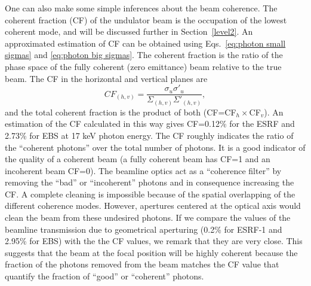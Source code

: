 \documentclass{iucr}              %
\begin{document}
One can also make some simple inferences about the beam coherence. The coherent fraction (CF) \cite{arxivCF} of the undulator beam is the occupation of the lowest coherent mode, and will be discussed further in Section~\ref{level2}. An approximated estimation of CF can be obtained using Eqs.~\ref{eq:photon small sigmas} and \ref{eq:photon big sigmas}. The coherent fraction is the ratio of the phase space of the fully coherent (zero emittance) beam relative to the true beam. The CF in the horizontal and vertical planes are
\begin{equation}\label{eq:coherent fraction}
 CF_{(h,v)} = \frac{\sigma_u \sigma'_u}{\Sigma_{(h,v)} \Sigma'_{(h,v)}},
\end{equation}
and the total coherent fraction is the product of both (CF=CF$_h \times $CF$_v$). An estimation of the CF calculated in this way gives CF=0.12\% for the ESRF and 2.73\% for EBS at 17 keV photon energy. The CF roughly indicates the ratio of the ``coherent photons'' over the total number of photons. It is a good indicator of the quality of a coherent beam (a fully coherent beam has CF=1 and an incoherent beam CF=0). The beamline optics act as a ``coherence filter'' by removing the ``bad'' or ``incoherent'' photons and in consequence increasing the CF. A complete cleaning is impossible because of the spatial overlapping of the different coherence modes. However, apertures centered at the optical axis would clean the beam from these undesired photons. If we compare the values of the beamline transmission due to geometrical aperturing  (0.2\% for ESRF-1 and 2.95\% for EBS) with the the CF values, we remark that they are very close. This suggests that the beam at the focal position will be highly coherent because the fraction of the photons removed from the beam matches the CF value that quantify the fraction of ``good'' or ``coherent'' photons. 
\end{document}
